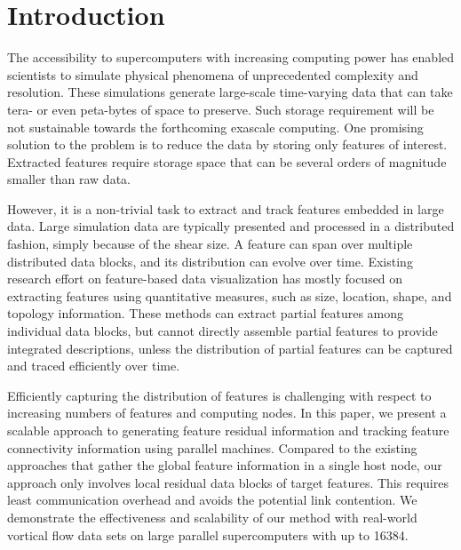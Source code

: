 \section{Introduction}

The accessibility to supercomputers with increasing computing power has enabled scientists to simulate physical phenomena of unprecedented complexity and resolution. These simulations generate large-scale time-varying data that can take tera- or even peta-bytes of space to preserve. Such storage requirement will be not sustainable towards the forthcoming exascale computing. One promising solution to the problem is to reduce the data by storing only features of interest. Extracted features require storage space that can be several orders of magnitude smaller than raw data.

However, it is a non-trivial task to extract and track features embedded in large data. Large simulation data are typically presented and processed in a distributed fashion, simply because of the shear size. A feature can span over multiple distributed data blocks, and its distribution can evolve over time. Existing research effort on feature-based data visualization has mostly focused on extracting features using quantitative measures, such as size, location, shape, and topology information. These methods can extract partial features among individual data blocks, but cannot directly assemble partial features to provide integrated descriptions, unless the distribution of partial features can be captured and traced efficiently over time.


Efficiently capturing the distribution of features is challenging with respect to increasing numbers of features and computing nodes. In this paper, we present a scalable approach to generating feature residual information and tracking feature connectivity information using parallel machines. Compared to the existing approaches that gather the global feature information in a single host node, our approach only involves local residual data blocks of target features. This requires least communication overhead and avoids the potential link contention. We demonstrate the effectiveness and scalability of our method with real-world vortical flow data sets on large parallel supercomputers with up to 16384.


